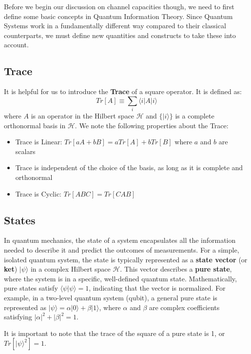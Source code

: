Before we begin our discussion on channel capacities though, we need to first define some
basic concepts in Quantum Information Theory. Since Quantum Systems work in a fundamentally
different way compared to their classical counterparts, we must define new quantities and
constructs to take these into account.

\subsection{Trace}
It is helpful for us to introduce the \textbf{Trace} of a square operator. It is defined as:
\begin{equation*}
    Tr[A] \equiv \displaystyle\sum_{i} \langle i | A | i \rangle
\end{equation*}
where $A$ is an operator in the Hilbert space $\mathcal{H}$ and $\{|i\rangle\}$ is a complete
orthonormal basis in $\mathcal{H}$.
We note the following properties about the Trace:
\begin{itemize}
    \item Trace is Linear: $Tr[aA + bB] = aTr[A] + bTr[B]$ where $a$ and $b$ are scalars
    \item Trace is independent of the choice of the basis, as long as it is complete and orthonormal
    \item Trace is Cyclic: $Tr[ABC] = Tr[CAB]$
\end{itemize} 

\subsection{States}

In quantum mechanics, the state of a system encapsulates all the information needed to describe
it and predict the outcomes of measurements. For a simple, isolated quantum system, the state
is typically represented as a \textbf{state vector} (or \textbf{ket}) \( |\psi\rangle \) in a
complex Hilbert space \( \mathcal{H} \). This vector describes a \textbf{pure state}, where the
system is in a specific, well-defined quantum state. Mathematically, pure states satisfy
\( \langle \psi | \psi \rangle = 1 \), indicating that the vector is normalized. For example,
in a two-level quantum system (qubit), a general pure state is represented as
\( |\psi\rangle = \alpha |0\rangle + \beta |1\rangle \), where \( \alpha \) and \( \beta \) are
complex coefficients satisfying \( |\alpha|^2 + |\beta|^2 = 1 \).

It is important to note that the trace of the square of a pure state is 1, or
$Tr[| \psi \rangle^2] = 1$.

